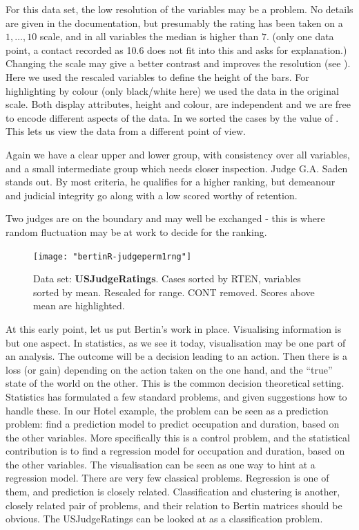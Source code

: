 \documentclass[nogin, dvips,12pt,a4paper,twoside]{amsart}
\begin{document}
 For this data set, the low resolution of the variables may be a problem. No details are given in the documentation, but  presumably the rating has been taken on a $1, \ldots, 10$ scale, and in all variables the median is higher than $7$. (only one data point, a contact recorded as 10.6 does not fit into this and asks for explanation.) Changing the scale may give a better contrast and improves the resolution (see ).  Here we used the rescaled variables to define the height of the bars. For highlighting by colour (only black/white here) we used the data in the original scale. Both display attributes, height and colour, are independent and we are free to encode different aspects of the data. In   we sorted the cases by the value of . This lets us view the data from a different point of view.
 
Again we have a clear upper and lower group, with consistency over all variables, and a small intermediate group which needs closer inspection. Judge G.A. Saden stands out. By most criteria, he qualifies for a higher ranking, but demeanour and judicial integrity go along with a low scored worthy of retention.

Two judges are on the boundary and may well be exchanged - this is where random fluctuation may be at work to decide for the ranking.

\begin{figure}[htbp]
\begin{center}
\texttt{[image: "bertinR-judgeperm1rng"]}
\caption{Data set: \textbf{USJudgeRatings}. Cases sorted by RTEN, variables sorted by mean. Rescaled for range. CONT removed. Scores above mean are highlighted.}
\label{fig:judgeperm1rng}
\end{center}
\end{figure}

\clearpage
At this early point, let us put Bertin's work in place. Visualising information is but one aspect. In statistics, as we see it today, visualisation may be one part of an analysis. The outcome will be a decision leading to an action. Then there is a loss (or gain) depending on the action taken on the one hand, and the ``true'' state of the world on the other. This is the common decision theoretical setting. Statistics has formulated a few standard problems, and given suggestions how to handle these. In our Hotel example, the problem can be seen as a prediction problem: find a prediction model to predict occupation and duration, based on the other variables. More specifically this is a control problem, and the statistical contribution is to find a regression model for occupation and duration, based on the other variables. The visualisation can be seen as one way to hint at a regression model. There are very few classical problems. Regression is one of them, and prediction is closely related. Classification and clustering is another, closely related pair of problems, and their relation to Bertin matrices should be obvious. The USJudgeRatings can be looked at as a classification problem.
\end{document}
